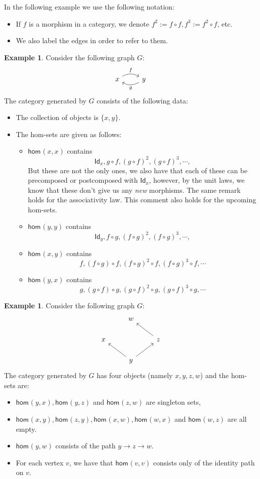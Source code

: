 \documentclass[a4paper,11pt, oneside,titlepage=false]{scrbook}
\theoremstyle{plain}
\theoremstyle{definition}
\newtheorem{exa}[thm]{Example}
\newcommand{\cfont}[1]{\ensuremath{\mathsf{#1}}}
\newcommand{\Hom}[3][]{\cfont{hom}_{#1}(#2,#3)}
\newcommand{\Id}[1][]{\cfont{Id}_{#1}}
\newcommand{\co}[2]{\ensuremath{#2 \circ #1}}
\begin{document}
In the following example we use the following notation: 
\begin{itemize}
\item If $f$ is a morphism in a category, we denote $f^{2} := \co{f}{f}, f^{3} := \co{f}{f^2}$, etc.
\item We also label the edges in order to refer to them.
\end{itemize}
\begin{exa}\label{exa:graph_xy_yx} Consider the following graph $G$:
\[
\begin{tikzcd}
x \arrow[r, "f", bend left] & y \arrow[l, "g", bend left]
\end{tikzcd}
\]
The category generated by $G$ consists of the following data:
\begin{itemize}
\item The collection of objects is $\{x,y\}$.
\item The hom-sets are given as follows:
\begin{itemize}
\item $\Hom{x}{x}$ contains
\[
\Id[x], \co{f}{g}, (\co{f}{g})^2, (\co{f}{g})^3, \cdots,
\]
But these are not the only ones, we also have that each of these can be precomposed or postcomposed with $\Id[x]$, however, by the unit laws, we know that these don't give us any \textit{new} morphisms. The same remark holds for the associativity law. This comment also holds for the upcoming hom-sets.
\item $\Hom{y}{y}$ contains
\[
\Id[y], \co{g}{f}, (\co{g}{f})^2, (\co{g}{f})^3, \cdots,
\]
\item $\Hom{x}{y}$ contains  
\[
f, \co{f}{(\co{g}{f})}, \co{f}{(\co{g}{f})^2}, \co{f}{(\co{g}{f})^3}, \cdots
\]
\item $\Hom{y}{x}$ contains
\[
g, \co{g}{(\co{f}{g})}, \co{g}{(\co{f}{g})^2}, \co{g}{(\co{f}{g})^3}, \cdots
\] 
\end{itemize}
\end{itemize}
\end{exa}

\begin{exa}\label{exa:graph_yx_yz_zw} Consider the following graph $G$:
\[
\begin{tikzcd}
& w & \\
x & & z \arrow[lu] \\
& y \arrow[lu] \arrow[ru] &
\end{tikzcd}
\]
The category generated by $G$ has four objects (namely $x,y,z,w$) and the hom-sets are: 
\begin{itemize}
\item $\Hom{y}{x}, \Hom{y}{z}$ and $\Hom{z}{w}$ are singleton sets, 
\item $\Hom{x}{y}, \Hom{z}{y}, \Hom{x}{w}, \Hom{w}{x}$ and $\Hom{w}{z}$ are all empty. 
\item $\Hom{y}{w}$ consists of the path $y\to z\to w$.
\item For each vertex $v$, we have that $\Hom{v}{v}$ consists only of the identity path on $v$.
\end{itemize}
\end{exa}
\end{document}
